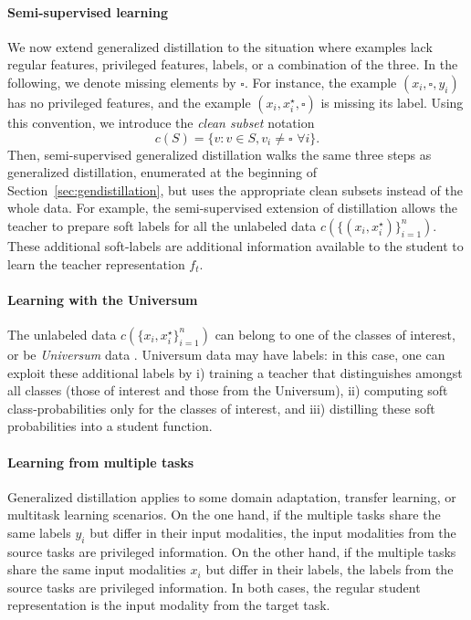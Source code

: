 \documentclass{article}
\begin{document}
\paragraph{Semi-supervised learning} We now extend generalized distillation to
the situation where examples lack regular features, privileged features,
labels, or a combination of the three. In the following, we denote missing
elements by $\square$. For instance, the example $(x_i, \square, y_i)$ has no
privileged features, and the example $(x_i,x^\star_i,\square)$ is missing its
label. Using this convention, we introduce the \emph{clean subset} notation
\begin{equation*}
  c(S) = \{ v : v \in S,  v_i \neq \square \,\, \forall i \}.
\end{equation*}
Then, semi-supervised generalized distillation walks the same three steps as
generalized distillation, enumerated at the beginning of
Section~\ref{sec:gendistillation}, but uses the appropriate clean subsets
instead of the whole data.  For example, the semi-supervised extension of
distillation allows the teacher to prepare soft labels for all
the unlabeled data $c(\{(x_i,x^\star_i)\}_{i=1}^n)$. These additional
soft-labels are additional information available to the student to learn the teacher
representation $f_t$.

\paragraph{Learning with the Universum} The unlabeled data
$c(\{x_i,x^\star_i\}_{i=1}^n)$ can belong to one of the classes of interest, or be
\emph{Universum} data \citep{Weston06,Chapelle07}. Universum data may have
labels: in this case, one can exploit these additional labels by i) training a
teacher that distinguishes amongst all classes (those of interest and those 
from the Universum), ii) computing soft class-probabilities only for the
classes of interest, and iii) distilling these soft probabilities into a
student function.

\paragraph{Learning from multiple tasks} Generalized distillation applies to
some domain adaptation, transfer learning, or multitask learning scenarios. On
the one hand, if the multiple tasks share the same labels $y_i$ but differ in
their input modalities, the input modalities from the source tasks are
privileged information.  On the other hand, if the multiple tasks share the
same input modalities $x_i$ but differ in their labels, the labels from the
source tasks are privileged information. In both cases, the regular student
representation is the input modality from the target task.
\end{document}
